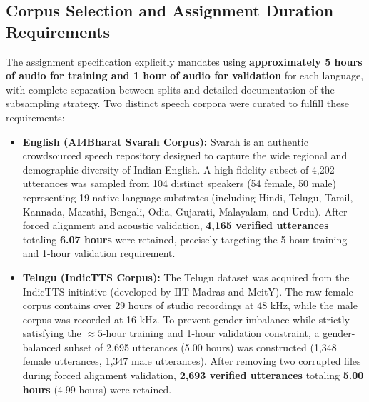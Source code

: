 \documentclass[11pt,a4paper]{article}
\begin{document}
\subsection{Corpus Selection and Assignment Duration Requirements}
The assignment specification explicitly mandates using \textbf{approximately 5 hours of audio for training and 1 hour of audio for validation} for each language, with complete separation between splits and detailed documentation of the subsampling strategy. Two distinct speech corpora were curated to fulfill these requirements:
\begin{itemize}
    \item \textbf{English (AI4Bharat Svarah Corpus):} Svarah is an authentic crowdsourced speech repository designed to capture the wide regional and demographic diversity of Indian English. A high-fidelity subset of 4,202 utterances was sampled from 104 distinct speakers (54 female, 50 male) representing 19 native language substrates (including Hindi, Telugu, Tamil, Kannada, Marathi, Bengali, Odia, Gujarati, Malayalam, and Urdu). After forced alignment and acoustic validation, \textbf{4,165 verified utterances} totaling \textbf{6.07 hours} were retained, precisely targeting the 5-hour training and 1-hour validation requirement.
    \item \textbf{Telugu (IndicTTS Corpus):} The Telugu dataset was acquired from the IndicTTS initiative (developed by IIT Madras and MeitY). The raw female corpus contains over 29 hours of studio recordings at 48 kHz, while the male corpus was recorded at 16 kHz. To prevent gender imbalance while strictly satisfying the $\approx 5$-hour training and 1-hour validation constraint, a gender-balanced subset of 2,695 utterances (5.00 hours) was constructed (1,348 female utterances, 1,347 male utterances). After removing two corrupted files during forced alignment validation, \textbf{2,693 verified utterances} totaling \textbf{5.00 hours} (4.99 hours) were retained.
\end{itemize}
\end{document}

